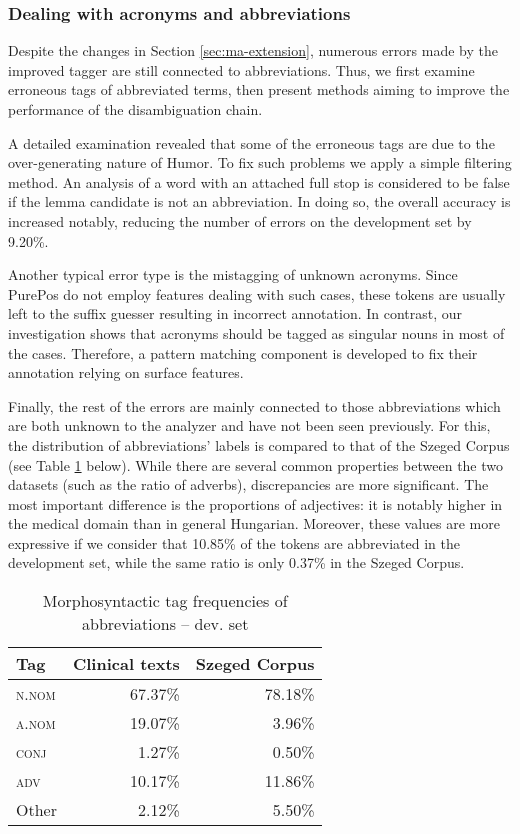 \subsubsection{Dealing with acronyms and abbreviations}

Despite the changes in Section \ref{sec:ma-extension}, numerous errors made by the improved tagger are still connected to abbreviations. 
Thus, we first examine erroneous tags of abbreviated terms, then present methods aiming to improve the performance of the disambiguation chain. %

A detailed examination revealed that some of the erroneous tags are due to the over-generating nature of Humor. 
To fix such problems we apply a simple filtering method. 
An analysis of a word with an attached full stop is considered to be false if the lemma candidate is not an abbreviation. 
In doing so, the overall accuracy is increased notably, reducing the number of errors on the development set by 9.20\%.

Another typical error type is the mistagging of unknown acronyms. 
Since PurePos do not employ features  dealing with such cases, these tokens are usually left to the suffix guesser resulting in incorrect annotation. 
In contrast, our investigation shows that acronyms should be tagged as singular nouns in most of the cases. 
Therefore, a pattern matching component is developed to fix their annotation relying on surface features.

Finally, the rest of the errors are mainly connected to those abbreviations which are both unknown to the analyzer and have not been seen previously. 
For this, the distribution of abbreviations' labels is compared to that of the Szeged Corpus (see Table \ref{tab:pos_distribution} below).
While there are several common properties between the two datasets (such as the ratio of adverbs), discrepancies are more significant. 
The most important difference is the proportions of adjectives: it is notably higher in the medical domain than in general Hungarian. 
Moreover, these values are more expressive if we consider that 10.85\% of the tokens are abbreviated in the development set, while the same ratio is only 0.37\% in the Szeged Corpus. 

\begin{table}[h]
\centering
\caption{Morphosyntactic tag frequencies of abbreviations -- dev. set}
\label{tab:pos_distribution}
\begin{tabular}{ l r r} 
\hline
Tag & Clinical texts & Szeged Corpus  \\ 
\hline
\scshape{n.nom} & 67.37\% & 78.18\% \\
\scshape{a.nom} & 19.07\% & 3.96\% \\
\scshape{conj} & 1.27\% & 0.50\% \\
\scshape{adv} & 10.17\% & 11.86\% \\
Other & 2.12\% & 5.50\% \\
\hline
\end{tabular}
\end{table}

